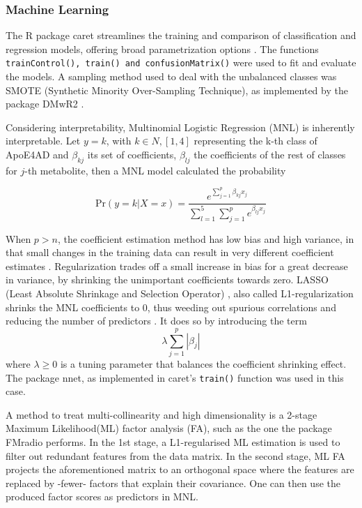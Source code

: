 \documentclass{amsart}
\theoremstyle{plain}
\begin{document}
\subsubsection{Machine Learning}
The R package \textsf{caret} streamlines the training and comparison of classification and regression models, offering broad parametrization options \cite{Kuhn2008BuildingPackage}. The functions \texttt{trainControl(), train() and confusionMatrix()} were used to fit and evaluate the models. A sampling method used to deal with the unbalanced classes was SMOTE (Synthetic Minority Over-Sampling Technique), as implemented by the package \textsf{DMwR2} \cite{DMwR2}.

Considering interpretability, Multinomial Logistic Regression (MNL) is inherently interpretable. Let $y = k$, with $k \in N, [1,4]$ representing the k-th class of ApoE4AD and $\beta_{kj}$ its set of coefficients,  $\beta_{lj}$ the coefficients of the rest of classes for $j$-th metabolite, then a MNL model calculated the probability

\[\textrm{Pr}(y=k|X=x) =  \dfrac{e^{\sum_{j=1}^{p}\beta_{kj}x_j}}{\sum_{l=1}^{5}\sum_{j=1}^{p}e^{\beta_{lj}x_j}}\]

When $p > n$, the coefficient estimation method has low bias and high variance, in that small changes in the training data can result in very different coefficient estimates \cite{James2023AnEdition}. Regularization trades off a small increase in bias for a great decrease in variance, by shrinking the unimportant coefficients towards zero. LASSO (Least Absolute Shrinkage and Selection Operator) \cite{Tibshiranit1996RegressionLasso}, also called L1-regularization shrinks the MNL coefficients to 0, thus weeding out spurious correlations and reducing the number of predictors \cite{Tibshiranit1996RegressionLasso}. It does so by introducing the term  \[\lambda\sum_{j=1}^{p}|\beta_j|\] where $\lambda \geq 0$ is a tuning parameter that balances the coefficient shrinking effect. The package \textsf{nnet}, as implemented in \textsf{caret}'s \texttt{train()} function was used in this case.

A method to treat multi-collinearity and high dimensionality is a 2-stage Maximum Likelihood(ML) factor analysis (FA), such as the one the package \textsf{FMradio} \cite{Peeters2019StableData} performs. In the 1st stage, a L1-regularised ML estimation is used to filter out redundant features from the data matrix. In the second stage, ML FA projects the aforementioned matrix to an orthogonal space where the features are replaced by -fewer- factors that explain their covariance. One can then use the produced factor scores as predictors in MNL.
\end{document}

